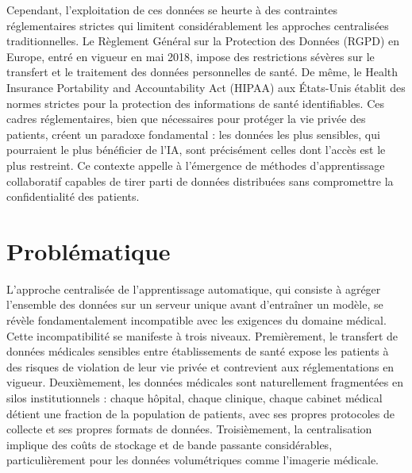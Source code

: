 \documentclass[12pt,a4paper]{report}
\begin{document}
Cependant, l'exploitation de ces donn\'{e}es se heurte \`{a} des contraintes r\'{e}glementaires strictes qui limitent consid\'{e}rablement les approches centralis\'{e}es traditionnelles. Le R\`{e}glement G\'{e}n\'{e}ral sur la Protection des Donn\'{e}es (RGPD) en Europe, entr\'{e} en vigueur en mai 2018, impose des restrictions s\'{e}v\`{e}res sur le transfert et le traitement des donn\'{e}es personnelles de sant\'{e}. De m\^{e}me, le Health Insurance Portability and Accountability Act (HIPAA) aux \'{E}tats-Unis \'{e}tablit des normes strictes pour la protection des informations de sant\'{e} identifiables. Ces cadres r\'{e}glementaires, bien que n\'{e}cessaires pour prot\'{e}ger la vie priv\'{e}e des patients, cr\'{e}ent un paradoxe fondamental : les donn\'{e}es les plus sensibles, qui pourraient le plus b\'{e}n\'{e}ficier de l'IA, sont pr\'{e}cis\'{e}ment celles dont l'acc\`{e}s est le plus restreint. Ce contexte appelle \`{a} l'\'{e}mergence de m\'{e}thodes d'apprentissage collaboratif capables de tirer parti de donn\'{e}es distribu\'{e}es sans compromettre la confidentialit\'{e} des patients.

\section{Probl\'{e}matique}

L'approche centralis\'{e}e de l'apprentissage automatique, qui consiste \`{a} agr\'{e}ger l'ensemble des donn\'{e}es sur un serveur unique avant d'entra\^{i}ner un mod\`{e}le, se r\'{e}v\`{e}le fondamentalement incompatible avec les exigences du domaine m\'{e}dical. Cette incompatibilit\'{e} se manifeste \`{a} trois niveaux. Premi\`{e}rement, le transfert de donn\'{e}es m\'{e}dicales sensibles entre \'{e}tablissements de sant\'{e} expose les patients \`{a} des risques de violation de leur vie priv\'{e}e et contrevient aux r\'{e}glementations en vigueur. Deuxi\`{e}mement, les donn\'{e}es m\'{e}dicales sont naturellement fragment\'{e}es en silos institutionnels : chaque h\^{o}pital, chaque clinique, chaque cabinet m\'{e}dical d\'{e}tient une fraction de la population de patients, avec ses propres protocoles de collecte et ses propres formats de donn\'{e}es. Troisi\`{e}mement, la centralisation implique des co\^{u}ts de stockage et de bande passante consid\'{e}rables, particuli\`{e}rement pour les donn\'{e}es volum\'{e}triques comme l'imagerie m\'{e}dicale.
\end{document}
